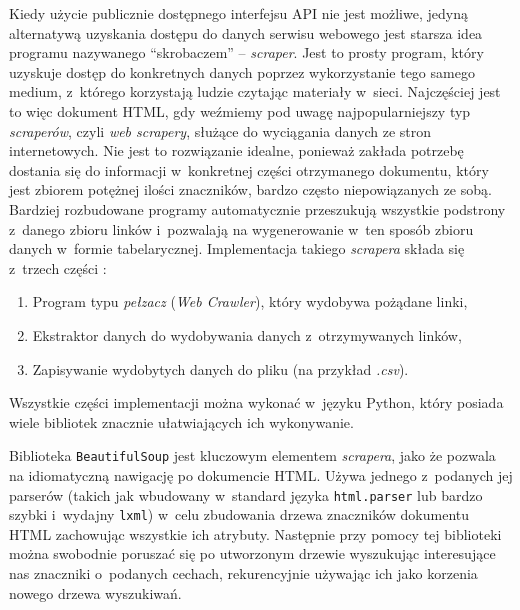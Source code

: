Kiedy użycie publicznie dostępnego interfejsu API nie jest możliwe, jedyną alternatywą uzyskania dostępu do danych serwisu webowego jest starsza idea programu nazywanego ``skrobaczem'' -- \emph{scraper}.
Jest to prosty program, który uzyskuje dostęp do konkretnych danych poprzez wykorzystanie tego samego medium, z~którego korzystają ludzie czytając materiały w~sieci.
Najczęściej jest to więc dokument HTML, gdy weźmiemy pod uwagę najpopularniejszy typ \emph{scraperów}, czyli \emph{web scrapery}, służące do wyciągania danych ze stron internetowych.
Nie jest to rozwiązanie idealne, ponieważ zakłada potrzebę dostania się do informacji w~konkretnej części otrzymanego dokumentu, który jest zbiorem potężnej ilości znaczników, bardzo często niepowiązanych ze sobą.
Bardziej rozbudowane programy automatycznie przeszukują wszystkie podstrony z~danego zbioru linków i~pozwalają na wygenerowanie w~ten sposób zbioru danych w~formie tabelarycznej.
Implementacja takiego \emph{scrapera} składa się z~trzech części \cite{mahto2016dive}:
\begin{enumerate}
	\item Program typu \emph{pełzacz} (\emph{Web Crawler}), który wydobywa pożądane linki,
	\item Ekstraktor danych do wydobywania danych z~otrzymywanych linków,
	\item Zapisywanie wydobytych danych do pliku (na przykład \emph{.csv}).
\end{enumerate}
Wszystkie części implementacji można wykonać w~języku Python, który posiada wiele bibliotek znacznie ułatwiających ich wykonywanie.

Biblioteka \texttt{BeautifulSoup} jest kluczowym elementem \emph{scrapera}, jako że pozwala na idiomatyczną nawigację po dokumencie HTML.
Używa jednego z~podanych jej parserów (takich jak wbudowany w~standard języka \texttt{html.parser} lub bardzo szybki i~wydajny \texttt{lxml}) w~celu zbudowania drzewa znaczników dokumentu HTML zachowując wszystkie ich atrybuty.
Następnie przy pomocy tej biblioteki można swobodnie poruszać się po utworzonym drzewie wyszukując interesujące nas znaczniki o~podanych cechach, rekurencyjnie używając ich jako korzenia nowego drzewa wyszukiwań.

